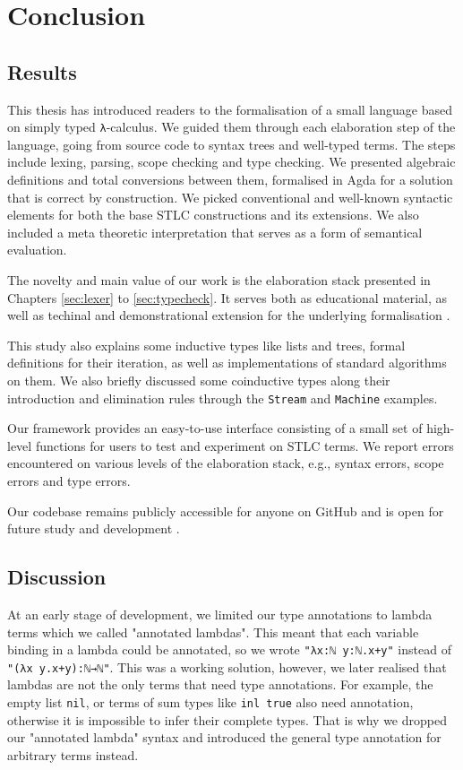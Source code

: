 \chapter{Conclusion}
\label{ch:conclusion}

\section{Results}

This thesis has introduced readers to the formalisation of a small language based on simply typed \verb$λ$-calculus. We guided them through each elaboration step of the language, going from source code to syntax trees and well-typed terms. The steps include lexing, parsing, scope checking and type checking. We presented algebraic definitions and total conversions between them, formalised in Agda for a solution that is correct by construction. We picked conventional and well-known syntactic elements for both the base STLC constructions and its extensions. We also included a meta theoretic interpretation that serves as a form of semantical evaluation.

The novelty and main value of our work is the elaboration stack presented in Chapters \ref{sec:lexer} to \ref{sec:typecheck}. It serves both as educational material, as well as techinal and demonstrational extension for the underlying formalisation \cite{typesystems-repo}.

This study also explains some inductive types like lists and trees, formal definitions for their iteration, as well as implementations of standard algorithms on them. We also briefly discussed some coinductive types along their introduction and elimination rules through the \verb$Stream$ and \verb$Machine$ examples.

Our framework provides an easy-to-use interface consisting of a small set of high-level functions for users to test and experiment on STLC terms. We report errors encountered on various levels of the elaboration stack, e.g., syntax errors, scope errors and type errors.

Our codebase remains publicly accessible for anyone on GitHub and is open for future study and development \cite{home-repo}.

\section{Discussion}

At an early stage of development, we limited our type annotations to lambda terms which we called "annotated lambdas". This meant that each variable binding in a lambda could be annotated, so we wrote \verb$"λx:ℕ y:ℕ.x+y"$ instead of \verb$"(λx y.x+y):ℕ→ℕ"$. This was a working solution, however, we later realised that lambdas are not the only terms that need type annotations. For example, the empty list \verb$nil$, or terms of sum types like \verb$inl true$ also need annotation, otherwise it is impossible to infer their complete types. That is why we dropped our "annotated lambda" syntax and introduced the general type annotation for arbitrary terms instead.

